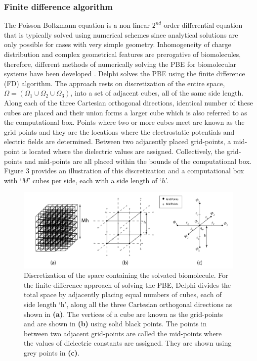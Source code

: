 \documentclass[9pt,tutorial]{livecoms}
\begin{document}
\subsubsection{Finite difference algorithm}
The Poisson-Boltzmann equation is a non-linear $2^{nd}$ order differential equation that is typically solved using numerical schemes since analytical solutions are only possible for cases with very simple geometry. Inhomogeneity of charge distribution and complex geometrical features are prerogative of biomolecules, therefore, different methods of numerically solving the PBE for biomolecular systems have been developed \cite{klapper1986focusing,davis1989solving,cortis1997numerical,baker2001electrostatics,shestakov2002solution,miertuvs1981electrostatic,totrov2001rapid,lu2009adaptive}. 
Delphi solves the PBE using the finite difference (FD) algorithm. The approach rests on discretization of the entire space, $ \Omega=(\Omega_1 \cup \Omega_2 \cup \Omega_3)$, into a set of adjacent cubes, all of the same side length. Along each of the three Cartesian orthogonal directions, identical number of these cubes are placed and their union forms a larger cube which is also referred to as the computational box. Points where two or more cubes meet are known as the grid points and they are the locations where the electrostatic potentials and electric fields are determined.  Between two adjacently placed grid-points, a mid-point is located where the dielectric values are assigned. Collectively, the grid-points and mid-points are all placed within the bounds of the computational box. Figure 3 provides an illustration of this discretization and a computational box with ‘$ M $’ cubes per side, each with a side length of ‘$ h $’. 

\begin{figure}
\includegraphics[width=0.95\linewidth]{Figure_3.png}
\caption{Discretization of the space containing the solvated biomolecule. For the finite-difference approach of solving the PBE, Delphi divides the total space by adjacently placing equal numbers of cubes, each of side length ‘h’, along all the three Cartesian orthogonal directions as shown in \textbf{(a)}. The vertices of a cube are known as the grid-points and are shown in \textbf{(b)} using solid black points. The points in between two adjacent grid-points are called the mid-points where the values of dielectric constants are assigned. They are shown using grey points in \textbf{(c)}.}
\label{fig:grid-scheme-representation}
\end{figure}
 
\end{document}
